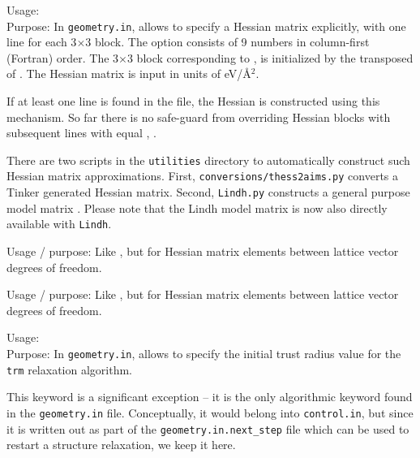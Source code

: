 {
  \noindent 
  Usage:    \\[1.0ex]
  Purpose: In \texttt{geometry.in}, allows to specify a Hessian matrix
  explicitly, with one line for each 3$\times3$ block.  The option
   consists of 9 numbers in column-first (Fortran) order.  The
  3$\times$3 block corresponding to ,  is
  initialized by the transposed of . The Hessian matrix is input
  in units of eV/\AA$^2$.\\
} 

If at least one  line is found in the file, the
Hessian is constructed using this mechanism.  So far there is no safe-guard
from overriding Hessian blocks with subsequent lines with equal
, .

There are two scripts in the \texttt{utilities} directory to automatically
construct such Hessian matrix approximations.  First,
\texttt{conversions/thess2aims.py} converts a Tinker generated Hessian matrix.
Second, \texttt{Lindh.py} constructs a general purpose model matrix
\cite{Lin95}.  Please note that the Lindh model matrix is now also directly
available with  \texttt{Lindh}.

{
  \noindent 
  Usage / purpose: Like , but for Hessian
  matrix elements between lattice vector degrees of freedom.\\
} 

{
  \noindent 
  Usage / purpose: Like , but for Hessian
  matrix elements between lattice vector degrees of freedom.\\
} 

{
  \noindent 
  Usage:   \\[1.0ex]
  Purpose: In \texttt{geometry.in}, allows to specify the initial
  trust radius value for the \texttt{trm} relaxation algorithm. \\ 
} 

This keyword is a significant exception -- it is the only
algorithmic keyword found in the \texttt{geometry.in}
file. Conceptually, it would belong into \texttt{control.in}, but
since it is written out as part of the \texttt{geometry.in.next\_step}
file which can be used to restart a structure relaxation, we keep it
here. 

